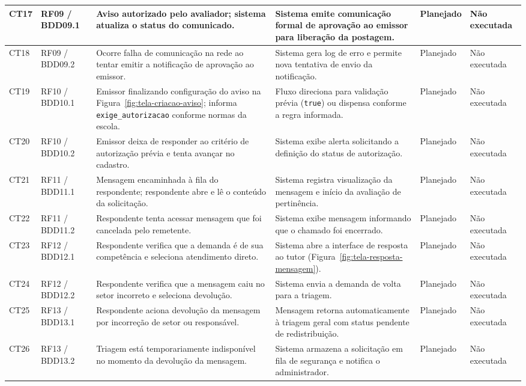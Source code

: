 \documentclass[a4paper,12pt]{report}
\begin{document}
\begin{longtable}{|p{1.2cm}|p{2.0cm}|p{3.8cm}|p{4.0cm}|p{1.6cm}|p{2.0cm}|}
\hline
CT17 & RF09 / BDD09.1 & Aviso autorizado pelo avaliador; sistema atualiza o status do comunicado. & Sistema emite comunicação formal de aprovação ao emissor para liberação da postagem. & Planejado & Não executada \\
\hline
CT18 & RF09 / BDD09.2 & Ocorre falha de comunicação na rede ao tentar emitir a notificação de aprovação ao emissor. & Sistema gera log de erro e permite nova tentativa de envio da notificação. & Planejado & Não executada \\
\hline
CT19 & RF10 / BDD10.1 & Emissor finalizando configuração do aviso na Figura~\ref{fig:tela-criacao-aviso}; informa \texttt{exige\_autorizacao} conforme normas da escola. & Fluxo direciona para validação prévia (\texttt{true}) ou dispensa conforme a regra informada. & Planejado & Não executada \\
\hline
CT20 & RF10 / BDD10.2 & Emissor deixa de responder ao critério de autorização prévia e tenta avançar no cadastro. & Sistema exibe alerta solicitando a definição do status de autorização. & Planejado & Não executada \\
\hline
CT21 & RF11 / BDD11.1 & Mensagem encaminhada à fila do respondente; respondente abre e lê o conteúdo da solicitação. & Sistema registra visualização da mensagem e início da avaliação de pertinência. & Planejado & Não executada \\
\hline
CT22 & RF11 / BDD11.2 & Respondente tenta acessar mensagem que foi cancelada pelo remetente. & Sistema exibe mensagem informando que o chamado foi encerrado. & Planejado & Não executada \\
\hline
CT23 & RF12 / BDD12.1 & Respondente verifica que a demanda é de sua competência e seleciona atendimento direto. & Sistema abre a interface de resposta ao tutor (Figura~\ref{fig:tela-resposta-mensagem}). & Planejado & Não executada \\
\hline
CT24 & RF12 / BDD12.2 & Respondente verifica que a mensagem caiu no setor incorreto e seleciona devolução. & Sistema envia a demanda de volta para a triagem. & Planejado & Não executada \\
\hline
CT25 & RF13 / BDD13.1 & Respondente aciona devolução da mensagem por incorreção de setor ou responsável. & Mensagem retorna automaticamente à triagem geral com status pendente de redistribuição. & Planejado & Não executada \\
\hline
CT26 & RF13 / BDD13.2 & Triagem está temporariamente indisponível no momento da devolução da mensagem. & Sistema armazena a solicitação em fila de segurança e notifica o administrador. & Planejado & Não executada \\

\end{longtable}
\end{document}

